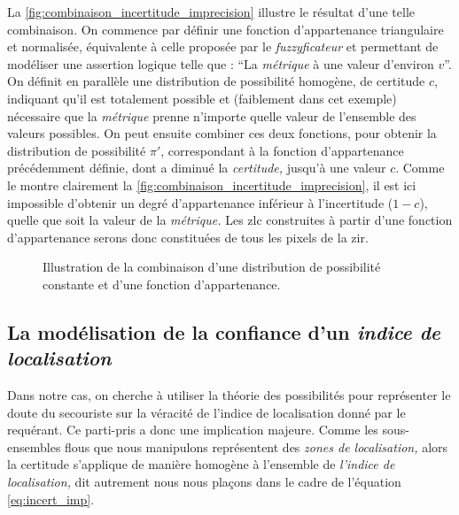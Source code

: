La \autoref{fig:combinaison_incertitude_imprecision} illustre le
résultat d'une telle combinaison. On commence par définir une fonction
d'appartenance triangulaire et normalisée, équivalente à celle
proposée par le \emph{fuzzyficateur}  et
permettant de modéliser une assertion logique telle que : \enquote{La
  \emph{métrique} à une valeur d'environ \(v\)}. On définit en
parallèle une distribution de possibilité homogène, de certitude
\(c\), indiquant qu'il est totalement possible et (faiblement dans cet
exemple) nécessaire que la \emph{métrique} prenne n'importe quelle
valeur de l'ensemble des valeurs possibles. On peut ensuite combiner
ces deux fonctions, pour obtenir la distribution de possibilité
\(\pi'\), correspondant à la fonction d’appartenance précédemment
définie, dont a diminué la \emph{certitude,} jusqu'à une valeur
\(c\). Comme le montre clairement la
\autoref{fig:combinaison_incertitude_imprecision}, il est ici
impossible d'obtenir un degré d'appartenance inférieur à l'incertitude
(\(1-c\)), quelle que soit la valeur de la \emph{métrique.} Les
\ac{zlc} construites à partir d'une fonction d'appartenance serons
donc constituées de tous les pixels de la \ac{zir}.

\begin{figure}
  \centering
  
  \caption{Illustration de la combinaison d'une distribution de
    possibilité constante et d'une fonction d'appartenance.}
  \label{fig:combinaison_incertitude_imprecision}
\end{figure}

\subsection{La modélisation de la confiance d'un \emph{indice de
    localisation}}

Dans notre cas, on cherche à utiliser la théorie des possibilités pour
représenter le doute du secouriste sur la véracité de l'indice de
localisation donné par le requérant. Ce parti-pris a donc une
implication majeure. Comme les sous-ensembles flous que nous
manipulons représentent des \emph{zones de localisation,} alors la
certitude s'applique de manière homogène à l'ensemble de
\emph{l'indice de localisation,} dit autrement nous nous plaçons dans
le cadre de l'équation \ref{eq:incert_imp}.

